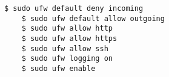 \begin{lstlisting}[language=term,catption=Konfiguration der UFW mit ad-hoc Kommandos,label=ad-hoc-config]
    $ sudo ufw default deny incoming
    $ sudo ufw default allow outgoing
    $ sudo ufw allow http
    $ sudo ufw allow https
    $ sudo ufw allow ssh
    $ sudo ufw logging on
    $ sudo ufw enable
\end{lstlisting}
